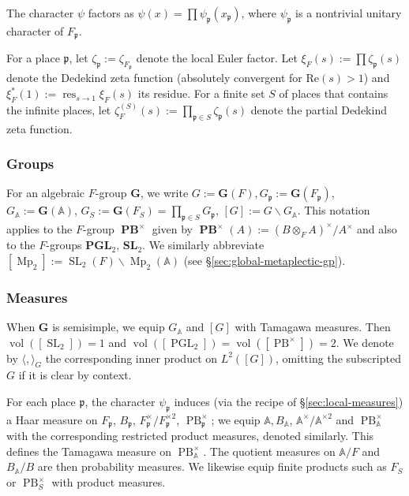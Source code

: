 \documentclass[reqno,10pt]{amsart}
\theoremstyle{plain} %
\theoremstyle{definition}
\theoremstyle{plain} %
\theoremstyle{remark}
\theoremstyle{itplain} %
\theoremstyle{remark} %
\renewcommand{\Re}{\mathrm{Re}}
\numberwithin{equation}{section}
\DeclareMathOperator{\SL}{SL}
\DeclareMathOperator{\Mp}{Mp}
\def\PB{\operatorname{PB}}
\def\PGL{\operatorname{PGL}}
\DeclareMathOperator{\bPB}{{\mathbf P}{\mathbf B}}
\DeclareMathOperator{\res}{res}
\DeclareMathOperator{\vol}{vol}
\begin{document}
The character $\psi$ factors as $\psi(x) = \prod \psi_\mathfrak{p}(x_\mathfrak{p})$, where $\psi_\mathfrak{p}$ is a nontrivial unitary character of $F_\mathfrak{p}$.

For a place $\mathfrak{p}$, let $\zeta_\mathfrak{p} := \zeta_{F_\mathfrak{p}}$ denote the local Euler factor.  Let $\xi_F(s) := \prod \zeta_\mathfrak{p}(s)$ denote the Dedekind zeta function (absolutely convergent for $\Re(s) > 1$) and $\xi_F^*(1) := \res_{s \rightarrow 1} \xi_F(s)$ its residue.  For a finite set $S$ of places that contains the infinite places, let $\zeta_F^{(S)}(s) := \prod_{\mathfrak{p} \in S} \zeta_\mathfrak{p}(s)$ denote the partial Dedekind zeta function.

\subsubsection{Groups}\label{sec:35ac3e56f4}
For an algebraic $F$-group $\mathbf{G}$, we write $G := \mathbf{G}(F), G_\mathfrak{p} := \mathbf{G}(F_\mathfrak{p})$, $G_\mathbb{A} := \mathbf{G}(\mathbb{A})$, $G_S := \mathbf{G}(F_S) = \prod_{\mathfrak{p} \in S} G_\mathfrak{p}$, $[G] := G \backslash G_\mathbb{A}$.  This notation applies to the $F$-group $\bPB^\times$ given by $\bPB^\times(A) := (B \otimes_F A)^\times/A^\times$ and also to the $F$-groups ${{\mathbf P}{\mathbf G}{\mathbf L}}_2$, ${{\mathbf S}{\mathbf L}}_2$.  We similarly abbreviate $[\Mp_2] := \SL_2(F) \backslash \Mp_2(\mathbb{A})$ (see \S\ref{sec:global-metaplectic-gp}).

\subsubsection{Measures\label{sec:global-measures}}
\label{sec-3-1-2}
When $\mathbf{G}$ is semisimple, we equip $G_\mathbb{A}$ and $[G]$ with Tamagawa measures.  Then $\vol([\SL_2]) = 1$ and $\vol([\PGL_2]) = \vol([\PB^\times]) = 2$.  We denote by $\langle , \rangle_{G}$ the corresponding inner product on $L^2([G])$, omitting the subscripted $G$ if it is clear by context.

For each place $\mathfrak{p}$, the character $\psi_\mathfrak{p}$ induces (via the recipe of \S\ref{sec:local-measures}) a Haar measure on $F_\mathfrak{p}$, $B_\mathfrak{p}$, $F_\mathfrak{p}^{\times} / F_{\mathfrak{p}}^{\times 2}$, $\PB^\times_\mathfrak{p}$; we equip $\mathbb{A}, B_\mathbb{A}$, $\mathbb{A}^{\times} / \mathbb{A}^{\times 2}$ and $\PB^\times_\mathbb{A}$ with the corresponding restricted product measures, denoted similarly.  This defines the Tamagawa measure on $\PB^\times_\mathbb{A}$.  The quotient measures on $\mathbb{A}/F$ and $B_\mathbb{A}/B$ are then probability measures.  We likewise equip finite products such as $F_S$ or $\PB^\times_S$ with product measures.
\end{document}
